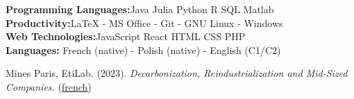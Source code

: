     \noindent\textbf{Programming Languages:}\hfill{Java \tbar Julia \tbar Python \tbar R \tbar SQL \tbar Matlab} \\
    \textbf{Productivity:}\hfill LaTeX - MS Office - Git - GNU Linux - Windows\\
    \textbf{Web Technologies:}\hfill JavaScript \tbar React \tbar HTML \tbar CSS \tbar PHP  \\
    \textbf{Languages:} \hfill French (native) - Polish (native) - English (C1/C2) 

\begin{flushleft}
\raisebox{-.6ex}{CONTRIBUTIONS} \hrulefill
\end{flushleft}

    \noindent Mines Paris, EtiLab. (2023). \emph{Decarbonization, Reindustrialization and Mid-Sized Companies.} (\href{https://etilab.minesparis.psl.eu/wp-content/uploads/2023/12/etilab-decarboner-les-ETI-04dec23.pdf}{\underline{french}})  